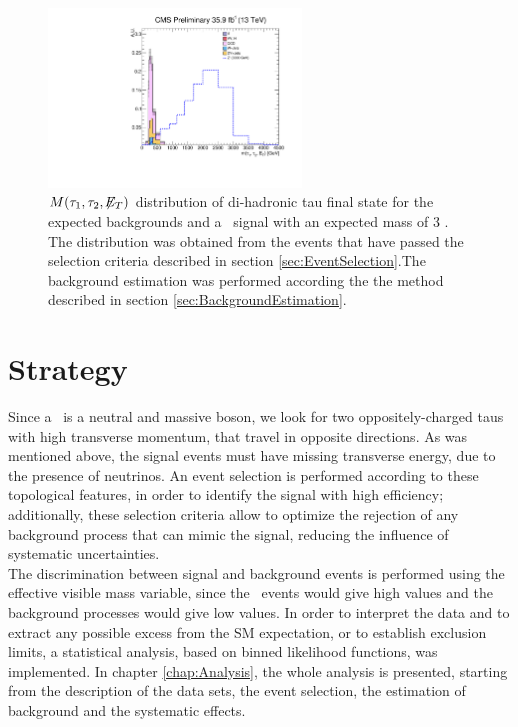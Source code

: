 \begin{figure}[ht]
 \begin{center}
 \captionsetup[subfloat]{farskip=0pt,captionskip=0.0cm,labelformat=empty}
 \includegraphics[clip,width=0.6\textwidth]{figuras/Chapter4/EffVisibleMass_unity.pdf}
\caption{  $M(\tau_1,\tau_2,\not\!\!E_T)$  distribution of di-hadronic tau 
final state for the expected backgrounds and 
a \Zprime~signal with an expected mass of 3 \TeV. The 
distribution was obtained from the events that have passed 
the selection criteria described in section \ref{sec:EventSelection}.The background 
estimation was performed according the the method described in section \ref{sec:BackgroundEstimation}. 
}
\label{eq:Zprime_mass_distribution}
 \end{center}
\end{figure}

\section{Strategy}
\label{sec:Strategy}

Since a \Zprime~is a neutral and massive boson, we look for 
two oppositely-charged taus with high transverse momentum, that 
travel in opposite directions. As was mentioned above, the signal events must
have missing transverse energy, due to the presence of neutrinos. An event selection 
is performed according to these topological features, 
in order to identify the signal with high efficiency; additionally, these
selection criteria allow to optimize the rejection of any background 
process that can mimic the signal, reducing the influence of systematic 
uncertainties. \\

\noindent The discrimination between signal and background events is performed
using the effective visible mass variable, since the \Zprimetotauh~events 
would give high values and the background processes would give low values. In order 
to interpret the data and to extract any possible excess from the 
SM expectation, or to establish exclusion limits, a statistical 
analysis, based on binned likelihood functions, was implemented. In 
chapter \ref{chap:Analysis}, the whole analysis is presented, starting from the 
description of the data sets, the event selection, the estimation of background 
and the systematic effects.
